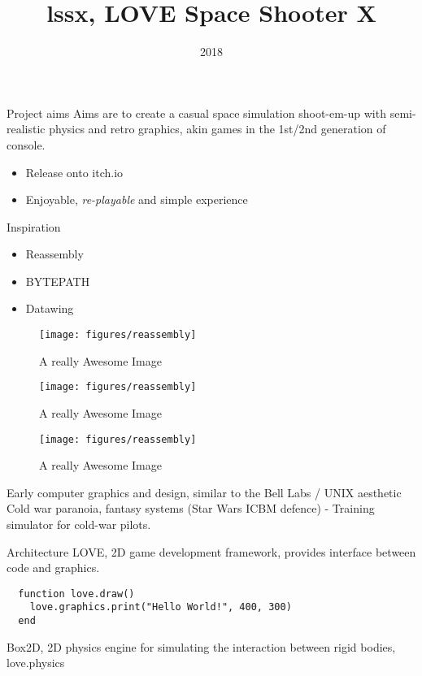 \documentclass{beamer}
\title[]{lssx, LOVE Space Shooter X} %
\author{}
\institute{John Leggott College}
\date{2018}
\begin{document}
\begin{frame}
  \titlepage
\end{frame}


\begin{frame}{Project aims}
  Aims are to create a casual space simulation shoot-em-up with semi-realistic physics and retro graphics, akin games in the 1st/2nd generation of console.
    \begin{itemize}
    \item Release onto itch.io
    \item Enjoyable, \textit{re-playable} and simple experience
    \end{itemize}
\end{frame}


\begin{frame}{Inspiration}
  \vspace*{-0.3cm}
  \begin{itemize}
  \item Reassembly
  \item BYTEPATH
  \item Datawing
  \end{itemize}

  \begin{figure}[!htb]
    \texttt{[image: figures/reassembly]}
    \caption{A really Awesome Image}\label{fig:awesome_image1}
  \endminipage\hfill
    \texttt{[image: figures/reassembly]}
    \caption{A really Awesome Image}\label{fig:awesome_image2}
  \endminipage\hfill
    \texttt{[image: figures/reassembly]}
    \caption{A really Awesome Image}\label{fig:awesome_image3}
  \endminipage
  \end{figure}

  Early computer graphics and design, similar to the Bell Labs / UNIX aesthetic
  Cold war paranoia, fantasy systems (Star Wars ICBM defence) - Training simulator for cold-war pilots.
\end{frame}


\begin{frame}[fragile=singleslide]{Architecture}
  LOVE, 2D game development framework, provides interface between code and graphics.

\begin{verbatim}
  function love.draw()
    love.graphics.print("Hello World!", 400, 300)
  end
\end{verbatim}

  Box2D, 2D physics engine for simulating the interaction between rigid bodies, love.physics
\end{frame}
\end{document}
